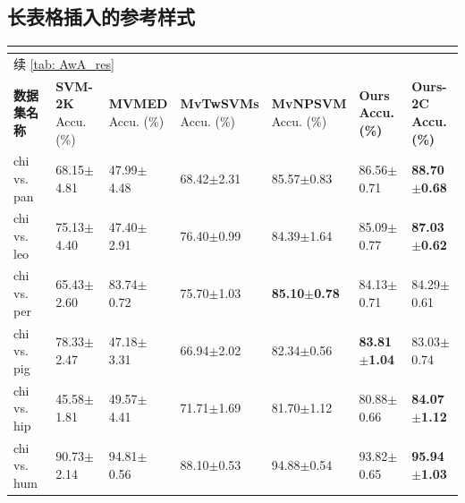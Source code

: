 \documentclass[twoside,zihao=-4,UTF8]{bjfu}
\begin{document}
\subsection{长表格插入的参考样式}
\newcommand{\tabincell}[2]{\begin{tabular}{@{}#1@{}}#2\end{tabular}} 
{
\begin{flushleft}
	\begin{longtable}[h]{p{55pt}p{50pt}p{50pt}p{50pt}p{50pt}p{50pt}p{50pt}}
		\bicaption{AwA数据集性能对比(Accu. $\pm$ std.) \vspace{1.1ex}}{Benchmark 
		results on AwA 
		data sets (Accu. $\pm $ std.)}
		\label{tab: AwA_res}\\
		\toprule[1.0pt]
		\endfirsthead
		\toprule[1.0pt]
		\multicolumn{7}{l}{续 \autoref{tab: AwA_res}}\\
		\midrule
		\endhead
		\bottomrule[1.0pt]
		\endfoot
		\tabincell{l}{\textbf{数据集名称} \\ {}} & \tabincell{l}{\textbf{SVM-2K} 
		\\ Accu. (\%) } & 
		\tabincell{l}{\textbf{MVMED} \\ Accu. (\%) } &  
		\tabincell{l}{\textbf{MvTwSVMs} \\ Accu. 
		(\%) } &
		\tabincell{l}{\textbf{MvNPSVM} \\ Accu. (\%) }& 
		\tabincell{l}{\textbf{Ours} \\ 
		\textbf{Accu. (\%)} } &
		\tabincell{l}{\textbf{Ours-2C} \\ \textbf{Accu. (\%)} }\\
		\midrule
		chi vs. pan & 68.15$\pm$4.81 & 47.99$\pm$4.48 & 68.42$\pm$2.31 & 
		85.57$\pm$0.83 & 86.56$\pm$0.71 & \textbf{88.70$\pm$0.68} \\
		chi vs. leo & 75.13$\pm$4.40 & 47.40$\pm$2.91 & 76.40$\pm$0.99 & 
		84.39$\pm$1.64 & 85.09$\pm$0.77 & \textbf{87.03$\pm$0.62} \\
		chi vs. per & 65.43$\pm$2.60 & 83.74$\pm$0.72 & 75.70$\pm$1.03 & 
		\textbf{85.10$\pm$0.78} & 84.13$\pm$0.71 & 84.29$\pm$0.61 \\
		chi vs. pig & 78.33$\pm$2.47 & 47.18$\pm$3.31 & 66.94$\pm$2.02 & 
		82.34$\pm$0.56 & \textbf{83.81$\pm$1.04} & 83.03$\pm$0.74 \\
		chi vs. hip & 45.58$\pm$1.81 & 49.57$\pm$4.41 & 71.71$\pm$1.69 & 
		81.70$\pm$1.12 & 80.88$\pm$0.66 & \textbf{84.07$\pm$1.12} \\
		chi vs. hum & 90.73$\pm$2.14 & 94.81$\pm$0.56 & 88.10$\pm$0.53 & 
		94.88$\pm$0.54 & 93.82$\pm$0.65 & \textbf{95.94$\pm$1.03} \\

\end{longtable}
\end{flushleft}}
\end{document}
